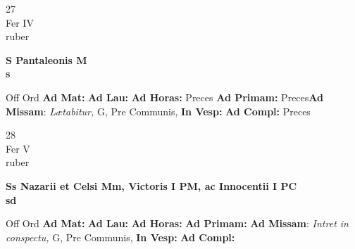 \documentclass[10pt, openany]{book}
\begin{document}
    \begin{center}
        \begin{minipage}{3.5in}
            \vspace{2em}
            \begin{minipage}{0.5in}
                {\Huge 27} \\
                {\normalsize Fer IV} \\
                {\normalsize ruber}
            \end{minipage}
            \begin{minipage}{3.0in}
                \textbf{ \large S Pantaleonis M \\
                \textnormal{\normalsize s}} \\ 
            \end{minipage}
            \begin{justify}Off Ord
                \textbf{Ad Mat: }
                \textbf{Ad Lau: }
                \textbf{Ad Horas: }Preces
                \textbf{Ad Primam: }Preces\textbf{Ad Missam}: \textit{Lætabitur,} G, Pre Communis,  
                \textbf{In Vesp: }
                \textbf{Ad Compl: }Preces
            \end{justify}
        \end{minipage}
    \end{center}

    \begin{center}
        \begin{minipage}{3.5in}
            \vspace{2em}
            \begin{minipage}{0.5in}
                {\Huge 28} \\
                {\normalsize Fer V} \\
                {\normalsize ruber}
            \end{minipage}
            \begin{minipage}{3.0in}
                \textbf{ \large Ss Nazarii et Celsi Mm, Victoris I PM, ac Innocentii I PC \\
                \textnormal{\normalsize sd}} \\ 
            \end{minipage}
            \begin{justify}Off Ord
                \textbf{Ad Mat: }
                \textbf{Ad Lau: }
                \textbf{Ad Horas: }
                \textbf{Ad Primam: }\textbf{Ad Missam}: \textit{Intret in conspectu,} G, Pre Communis,  
                \textbf{In Vesp: }
                \textbf{Ad Compl: }
            \end{justify}
        \end{minipage}
    \end{center}
\end{document}
